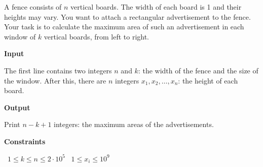 A fence consists of $n$ vertical boards. The width of each board is 1 and their heights may vary.
You want to attach a rectangular advertisement to the fence. Your task is to calculate the maximum area of such an advertisement in each window of $k$ vertical boards, from left to right.

\vspace{0.3cm}\noindent\textbf{Input}

The first line contains two integers $n$ and $k$: the width of the fence and the size of the window.
After this, there are $n$ integers $x_1, x_2, \dots, x_n$: the height of each board.

\vspace{0.3cm}\noindent\textbf{Output}

Print $n - k + 1$ integers: the maximum areas of the advertisements.

\vspace{0.3cm}\noindent\textbf{Constraints}

\textbullet\ $1 \le k \le n \le 2 \cdot 10^5$
\textbullet\ $1 \le x_i \le 10^9$